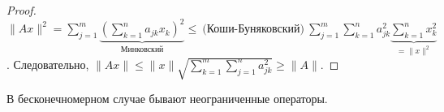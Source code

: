 \begin{proof}
    $\|Ax\|^2 = \sum\limits_{j=1}^m \underbrace{\left(\sum\limits_{k=1}^n a_{jk} x_k \right)^2}_{\text{Минковский}} \le\ \text{(Коши-Буняковский)}\ \sum\limits_{j=1}^m \sum\limits_{k=1}^n a_{jk}^2 \underbrace{\sum\limits_{k=1}^n x_k^2}_{=\|x\|^2}$. Следовательно, $\|Ax\| \le \|x\| \sqrt{\sum\limits_{k=1}^m \sum\limits_{j=1}^n a_{jk}^2} \ge \|A\|$.
\end{proof}
\begin{remark}
    В бесконечномерном случае бывают неограниченные операторы.
\end{remark}
